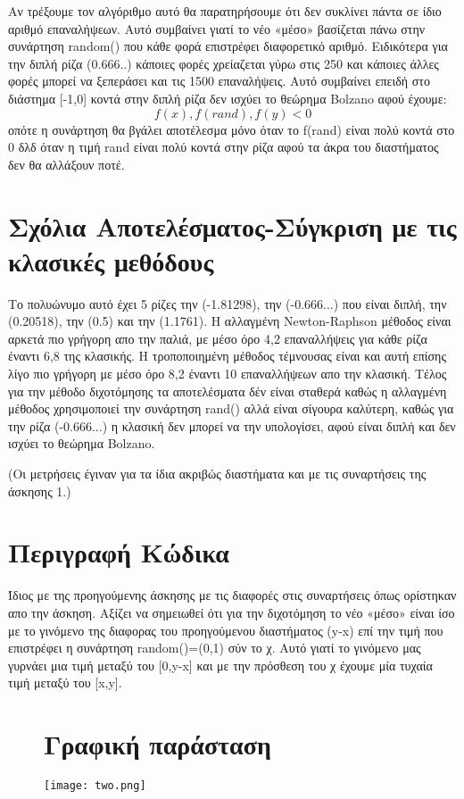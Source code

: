 \documentclass{article}
\begin{document}
    Αν τρέξουμε τον αλγόριθμο αυτό θα παρατηρήσουμε ότι δεν συκλίνει πάντα σε ίδιο αριθμό επαναλήψεων.
    Αυτό συμβαίνει γιατί το νέο «μέσο» βασίζεται πάνω στην συνάρτηση random() που κάθε φορά επιστρέφει διαφορετικό αριθμό.
    Ειδικότερα για την διπλή ρίζα (0.666..) κάποιες φορές χρείαζεται γύρω στις 250 και κάποιες άλλες φορές μπορεί να ξεπεράσει και τις 1500 επαναλήψεις. 
    Αυτό συμβαίνει επειδή στο διάστημα [-1,0] κοντά στην διπλή ρίζα 
    δεν ισχύει το θεώρημα Bolzano αφού έχουμε: 
    \begin{equation}
    f(x) , f(rand) , f(y) < 0
    \end{equation} 
    οπότε η συνάρτηση θα βγάλει αποτέλεσμα μόνο όταν το f(rand) είναι πολύ κοντά στο 0 δλδ όταν η τιμή rand είναι πολύ κοντά στην ρίζα αφού τα άκρα του διαστήματος δεν θα αλλάξουν ποτέ.
    
    
    \section{Σχόλια Αποτελέσματος-Σύγκριση με τις κλασικές μεθόδους}
    
    Το πολυώνυμο αυτό έχει 5 ρίζες την (-1.81298), την (-0.666...)  που είναι διπλή, την (0.20518), την (0.5) και την (1.1761).
    Η αλλαγμένη Newton-Raphson μέθοδος είναι αρκετά πιο γρήγορη απο την παλιά,
    με μέσο όρο 4,2 επαναλλήψεις για κάθε ρίζα έναντι 6,8 της κλασικής. 
    Η τροποποιημένη μέθοδος τέμνουσας είναι και αυτή επίσης λίγο πιο γρήγορη με μέσο όρο 8,2 έναντι 10 επαναλλήψεων απο την κλασική. 
    Τέλος για την μέθοδο διχοτόμησης τα αποτελέσματα δέν είναι σταθερά καθώς η αλλαγμένη μέθοδος χρησιμοποιεί την συνάρτηση rand() αλλά είναι σίγουρα καλύτερη, καθώς για την ρίζα (-0.666...) η κλασική δεν μπορεί να την υπολογίσει, αφού είναι διπλή και δεν ισχύει το θεώρημα Bolzano.
    
    (Οι μετρήσεις έγιναν για τα ίδια ακριβώς διαστήματα και με τις συναρτήσεις της άσκησης 1.)
    
    
    \section{Περιγραφή Κώδικα}
    
    Ίδιος με της προηγούμενης άσκησης με τις διαφορές στις συναρτήσεις όπως ορίστηκαν απο την άσκηση.
    Αξίζει να σημειωθεί ότι για την διχοτόμηση το νέο «μέσο» είναι ίσο με το γινόμενο της διαφορας του προηγούμενου διαστήματος (y-x) επί την τιμή που επιστρέφει η συνάρτηση random()=(0,1) σύν το χ. 
    Αυτό γιατί το γινόμενο μας γυρνάει μια τιμή μεταξύ του [0,y-x] και με την πρόσθεση του χ έχουμε μία τυχαία τιμή μεταξύ του [x,y]. 
    
    
\begin{figure}[t]
    \section{Γραφική παράσταση}
    \texttt{[image: two.png]}
\end{figure}
\end{document}
